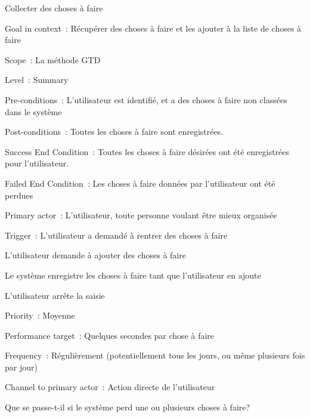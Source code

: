 	\begin{usecase}{Collecter des choses à faire}
	\begin{information}
	\item[Goal in context~:] Récupérer des choses à faire et les ajouter à la liste de choses à faire
	\item[Scope~:] La méthode GTD
	\item[Level~:] Summary
	\item[Pre-conditions~:] L'utilisateur est identifié, et a des choses à faire non classées dans le système
	\item[Post-conditions~:] Toutes les choses à faire sont enregistrées.
	\item[Success End Condition~:] Toutes les choses à faire désirées ont été enregistrées pour l'utilisateur.
	\item[Failed End Condition~:] Les choses à faire données par l'utilisateur ont été perdues
	\item[Primary actor~:] L'utilisateur, toute personne voulant être mieux organisée
	\item[Trigger~:] L'utilisateur a demandé à rentrer des choses à faire
	\\
	\end{information}
	\begin{scenario}
	\item L'utilisateur demande à ajouter des choses à faire
	\item Le système enregistre les choses à faire tant que l'utilisateur en ajoute
	\item L'utilisateur arrête la saisie
	\\
	\end{scenario}
	\begin{relatedinformation}
	\item[Priority~:] Moyenne
	\item[Performance target~:] Quelques secondes par chose à faire
	\item[Frequency~:] Régulièrement (potentiellement tous les jours, ou même plusieurs fois par jour)
	\item[Channel to primary actor~:] Action directe de l'utilisateur
	\\
	\end{relatedinformation}
	\begin{openissues}
	\item Que se passe-t-il si le système perd une ou plusieurs choses à faire?
	\\
	\end{openissues}
	\end{usecase}



